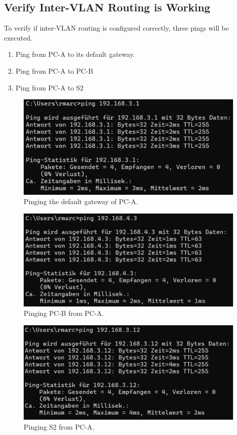 \documentclass[a4paper]{article}
\newcommand{\abc}{\hfill \break}
\begin{document}
\subsection{Verify Inter-VLAN Routing is Working}
To verify if inter-VLAN routing is configured correctly, three pings will be executed.
\begin{enumerate}
	\item Ping from PC-A to its default gateway.
	\item Ping from PC-A to PC-B
	\item Ping from PC-A to S2
\end{enumerate}
\begin{figure}[!htbp]
	\includegraphics[scale=0.55]{images/PC_A_ping_Gateway.png}
	\centering
	\caption{Pinging the default gateway of PC-A.}
\end{figure}
\begin{figure}[!htbp]
	\includegraphics[scale=0.55]{images/PC_A_ping_PC_B.png}
	\centering
	\caption{Pinging PC-B from PC-A.}
\end{figure}\newpage
\begin{figure}[!htbp]
	\includegraphics[scale=0.55]{images/PC_A_ping_S2.png}
	\centering
	\caption{Pinging S2 from PC-A.}
\end{figure}\abc
\end{document}
